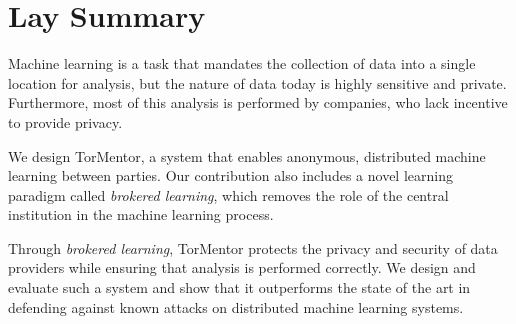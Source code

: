 

\chapter{Lay Summary}

Machine learning is a task that mandates the collection of data into a
single location for analysis, but the nature of data today is highly
sensitive and private. Furthermore, most of this analysis is performed
by companies, who lack incentive to provide privacy. 

We design TorMentor, a system that enables anonymous, distributed
machine learning between parties. Our contribution also includes a
novel learning paradigm called \textit{brokered learning}, which
removes the role of the central institution in the machine learning
process.

Through \textit{brokered learning}, TorMentor protects the privacy and
security of data providers while ensuring that analysis is performed
correctly. We design and evaluate such a system and show that it
outperforms the state of the art in defending against known attacks on
distributed machine learning systems.

